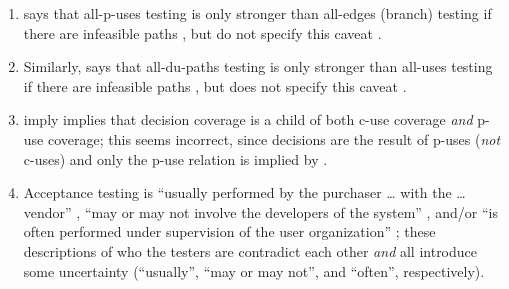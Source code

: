 \begin{enumerate}
          intervening definitions)'' (\citealp[p.~29]{IEEE2021}; similar in
          \citeyear[p.~125]{IEEE2017}; \citealp[p.~5-13]{SWEBOK2024};
          \citealp[p.~479]{PetersAndPedrycz2000}); however, paths containing
          simple cycles may also be required \citep[p.~425]{vanVliet2000}.
    \item %
           {} says that all-\acsp{p-use}
          testing is only stronger than all-edges (branch) testing if there are
          infeasible paths \citeyearpar[pp.~432-433]{vanVliet2000}, but
          \citeauthor{IEEE2021} \ifnotpaper do \else \does \fi not specify this
          caveat \citeyearpar[Fig.~F.1]{IEEE2021}.
    \item %
          Similarly, \citeauthor{vanVliet2000} says that all-\acsp{du-path}
          testing is only stronger than all-uses testing if there are
          infeasible paths \citeyearpar[pp.~432-433]{vanVliet2000}, but
          \citeauthor{SWEBOK2024} does not specify this caveat
          \citeyearpar[p.~5-13]{SWEBOK2024}.
    \item %
           \citet[Fig.~12.31]{PetersAndPedrycz2000} \ifnotpaper imply
          \else implies \fi that decision coverage is a child of both \acs{c-use}
          coverage \emph{and} \acs{p-use} coverage; this seems incorrect, since
          decisions are the result of \acsp{p-use} (\emph{not} \acsp{c-use})
          and only the \acs{p-use} relation is implied by
          \citep[Fig.~F.1]{IEEE2021}.
    \item %
          Acceptance testing is ``usually performed by the purchaser \dots{}
          with the \dots{} vendor'' \citep[p.~5]{IEEE2017}, ``may or may not
          involve the developers of the system'' \citep[p.~4-6]{SWEBOK2014},
          and/or ``is often performed under supervision of the user
          organization'' \citep[p.~439]{vanVliet2000}; these descriptions
          of who the testers are contradict each other \emph{and} all introduce
          some uncertainty
          (``usually'', ``may or may not'', and ``often'', respectively).


\end{enumerate}
